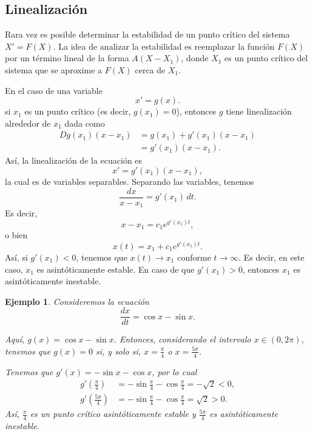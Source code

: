 \documentclass[11pt,letterpaper,draft]{report}
\newtheorem{exa}{Ejemplo}
\newcommand\<{\langle}
\renewcommand\>{\rangle}
\begin{document}
\subsection{Linealización}
Rara vez es posible determinar la estabilidad de un punto crítico
del sistema $X'=F(X)$.
La idea de analizar la estabilidad es reemplazar la función
$F(X)$ por un término lineal de la forma $A(X-X_1)$, donde $X_1$
es un punto crítico del sistema que se aproxime a $F(X)$ cerca de
$X_1$.

En el caso de una variable
\[
  x' = g(x)
.\]
si $x_1$ es un punto crítico (es decir, $g(x_1)=0$), entonces $g$
tiene linealización alrededor de $x_1$ dada como
\begin{align*}
  Dg(x_1)(x-x_1)
  &= g(x_1) + g'(x_1)(x-x_1) \\
  &= g'(x_1)(x-x_1).
\end{align*}
Así, la linealización de la ecuación es
\[
  x' = g'(x_1)(x-x_1)
,\]
la cual es de variables separables.
Separando las variables, tenemos
\[
  \frac{dx}{x-x_1} = g'(x_1)\,dt
.\]
Es decir,
\[
  x-x_1 = c_1e^{g'(x_1)t}
,\]
o bien
\[
  x(t) = x_1+c_1e^{g'(x_1)t}
.\]
Así, si $g'(x_1)<0$, tenemos que $x(t)\to x_1$ conforme
$t\to\infty$. Es decir, en este caso, $x_1$ es asintóticamente
estable.
En caso de que $g'(x_1)>0$, entonces $x_1$ es asintóticamente
inestable.

\begin{exa}
  Consideremos la ecuación
  \[
    \frac{dx}{dt} = \cos x - \sin x
  .\]
  
  Aquí, $g(x)=\cos x-\sin x$.
  Entonces, considerando el intervalo $x\in(0,2\pi)$, tenemos que
  $g(x)=0$ si, y solo si, $x=\frac{\pi}{4}$ o $x=\frac{5\pi}{4}$.

  Tenemos que $g'(x)=-\sin x-\cos x$, por lo cual
  \begin{align*}
    g'(\tfrac{\pi}{4})
    &=-\sin \frac{\pi}{4}-\cos \frac{\pi}{4}
    =-\sqrt 2
    < 0,
    \\
    g'(\tfrac{5\pi}{4})
    &=-\sin \tfrac{\pi}{4}-\cos \frac{\pi}{4}
    =\sqrt 2
    > 0.
  \end{align*}
  Así, $\frac{\pi}{4}$ es un punto crítico asintóticamente
  estable y $\frac{5\pi}{4}$ es asintóticamente inestable.
\end{exa}
\end{document}
